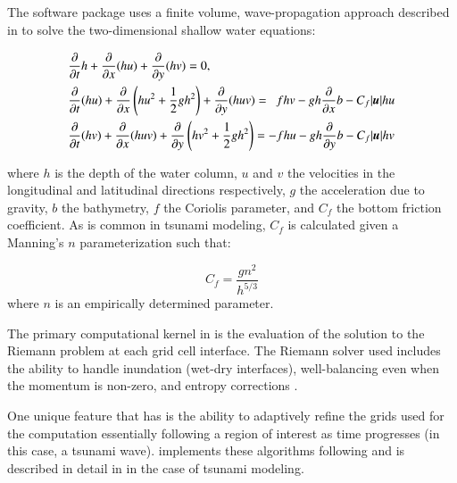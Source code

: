 

\subsection{\geoclaw} \label{ssub:geoclaw}

The \geoclaw software package uses a finite volume, wave-propagation approach described in \cite{LeVeque:1997eg} to solve the two-dimensional shallow water equations:

\begin{equation} \label{eq:swe}
    \begin{aligned}
    &\pd{}{t} h + \pd{}{x} (hu) + \pd{}{y} (hv) = 0, \\
    &\pd{}{t}(hu) + \pd{}{x} \left(hu^2 + \frac{1}{2} g h^2 \right ) + \pd{}{y} (huv) = ~~ fhv - gh \pd{}{x} b - C_f |\vec{u}| hu \\
    &\pd{}{t} (hv) + \pd{}{x} (huv) + \pd{}{y} \left (hv^2 + \frac{1}{2} gh^2 \right) = -fhu - gh \pd{}{y} b - C_f |\vec{u}| hv
    \end{aligned}
\end{equation}

where $h$ is the depth of the water column, $u$ and $v$ the velocities in the 
longitudinal and latitudinal directions respectively, $g$ the acceleration due 
to gravity, $b$ the bathymetry, $f$ the Coriolis parameter, and $C_f$ the bottom 
friction coefficient.  As is common in tsunami modeling, $C_f$ is calculated 
given a Manning's $n$ parameterization such that:

\begin{equation}
    C_f = \frac{g n^2}{h^{5/3}}
\end{equation}
where $n$ is an empirically determined parameter.  

The primary computational kernel in \geoclaw is the evaluation of the solution to the Riemann problem at each grid cell interface.  The Riemann solver used includes the ability to handle inundation (wet-dry interfaces), well-balancing even when the momentum is non-zero, and entropy corrections \cite{George:2008aa}.

One unique feature that \geoclaw has is the ability to adaptively refine the grids used for the computation essentially following a region of interest as time progresses (in this case, a tsunami wave).  \geoclaw implements these algorithms following \cite{Berger:1984ui,Berger:1998aa} and is described in detail in \cite{Berger:2011du} in the case of tsunami modeling.

